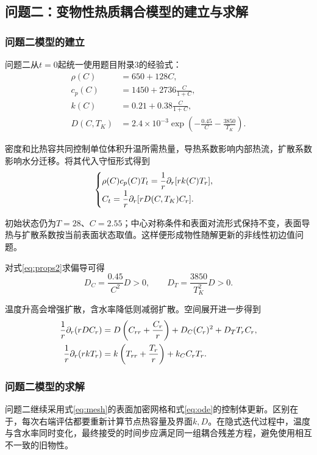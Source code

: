 \subsection{问题二：变物性热质耦合模型的建立与求解}
\subsubsection{问题二模型的建立}
问题二从$t=0$起统一使用题目附录3的经验式：
\begin{equation}
\begin{aligned}
\rho(C)&=650+128C,\\
c_p(C)&=1450+2736\frac{C}{1+C},\\
k(C)&=0.21+0.38\frac{C}{1+C},\\
D(C,T_K)&=2.4\times10^{-3}
\exp\left(-\frac{0.45}{C}-\frac{3850}{T_K}\right).
\end{aligned}
\label{eq:props2}
\end{equation}

密度和比热容共同控制单位体积升温所需热量，导热系数影响内部热流，扩散系数影响水分迁移。将其代入守恒形式得到
\begin{equation}
\begin{cases}
\rho(C)c_p(C)T_t=\dfrac1r\partial_r[rk(C)T_r],\\[4pt]
C_t=\dfrac1r\partial_r[rD(C,T_K)C_r].
\end{cases}
\label{eq:q2pde}
\end{equation}

初始状态仍为$T=28$、$C=2.55$；中心对称条件和表面对流形式保持不变，表面导热与扩散系数按当前表面状态取值。这样便形成物性随解更新的非线性初边值问题。

对式\eqref{eq:props2}求偏导可得
\begin{equation}
D_C=\frac{0.45}{C^2}D>0,\qquad
D_T=\frac{3850}{T_K^2}D>0.
\end{equation}

温度升高会增强扩散，含水率降低则减弱扩散。空间展开进一步得到
\begin{equation}
\begin{aligned}
\frac1r\partial_r(rDC_r)
&=D\left(C_{rr}+\frac{C_r}{r}\right)
+D_C(C_r)^2+D_TT_rC_r,\\
\frac1r\partial_r(rkT_r)
&=k\left(T_{rr}+\frac{T_r}{r}\right)+k_C C_rT_r .
\end{aligned}
\end{equation}


\subsubsection{问题二模型的求解}
问题二继续采用式\eqref{eq:mesh}的表面加密网格和式\eqref{eq:ode}的控制体更新。区别在于，每次右端评估都要重新计算节点热容量及界面$k,D$。在隐式迭代过程中，温度与含水率同时变化，最终接受的时间步应满足同一组耦合残差方程，避免使用相互不一致的旧物性。

